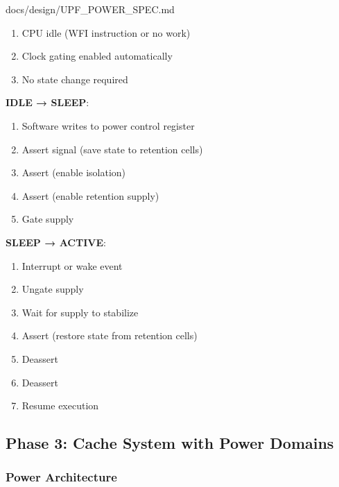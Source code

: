 \begin{relocated}{docs/design/UPF_POWER_SPEC.md}
\begin{enumerate}
\def\labelenumi{\arabic{enumi}.}
\tightlist
\item
  CPU idle (WFI instruction or no work)
\item
  Clock gating enabled automatically
\item
  No state change required
\end{enumerate}

\textbf{IDLE → SLEEP}:

\begin{enumerate}
\def\labelenumi{\arabic{enumi}.}
\tightlist
\item
  Software writes to power control register
\item
  Assert  signal (save state to retention cells)
\item
  Assert  (enable isolation)
\item
  Assert  (enable retention supply)
\item
  Gate  supply
\end{enumerate}

\textbf{SLEEP → ACTIVE}:

\begin{enumerate}
\def\labelenumi{\arabic{enumi}.}
\tightlist
\item
  Interrupt or wake event
\item
  Ungate  supply
\item
  Wait for supply to stabilize
\item
  Assert  (restore state from retention cells)
\item
  Deassert 
\item
  Deassert 
\item
  Resume execution
\end{enumerate}

\subsection{Phase 3: Cache System with Power Domains}\label{ds:ch:upf-power-spec:phase-3-cache-system-with-power-domains}

\subsubsection{Power Architecture}\label{ds:ch:upf-power-spec:power-architecture-2}


\end{relocated}
